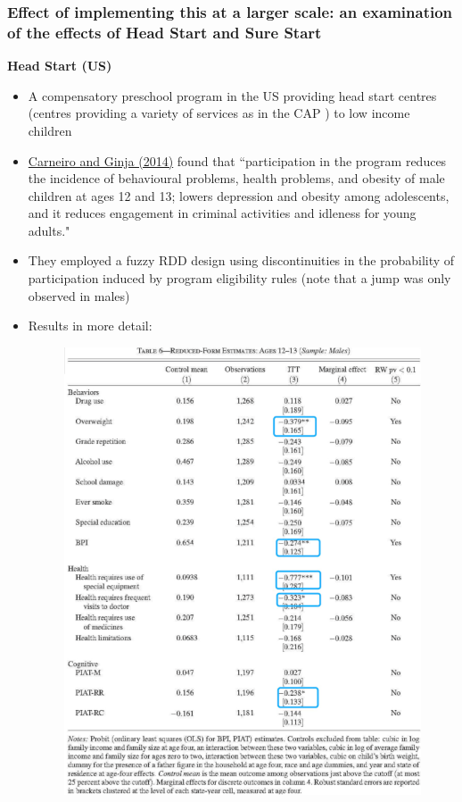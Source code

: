         \subsubsection{Effect of implementing this at a larger scale: an examination of the effects of Head Start and Sure Start}
            \textbf{Head Start (US)}
            \begin{itemize}
                \item A compensatory preschool program in the US providing head start centres (centres providing a variety of services as in the CAP ) to low income children 
                \item \href{https://www.aeaweb.org/articles?id=10.1257/pol.6.4.135}{Carneiro and Ginja (2014)} found that ``participation in the program reduces the
            incidence of behavioural problems, health problems, and
            obesity of male children at ages 12 and 13; lowers depression
            and obesity among adolescents, and it reduces engagement in
            criminal activities and idleness for young adults."
                \item They employed a fuzzy RDD design using discontinuities
            in the probability of participation induced by program eligibility
            rules (note that a jump was only observed in males)
            \item Results in more detail: 
                    \begin{figure}[H]%
                \centering
                \includegraphics[width=11.5cm]{images/ch4/HSeval.png}

\end{figure}
\end{itemize}
